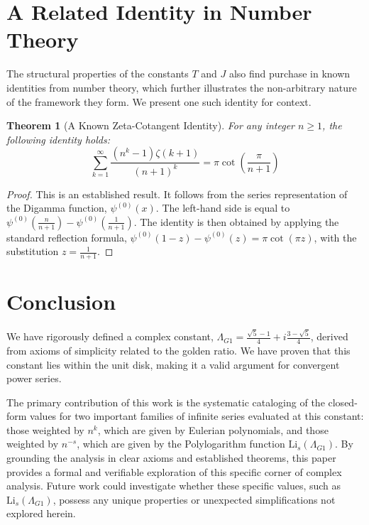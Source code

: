 \documentclass{amsart}
\theoremstyle{plain}
\newtheorem{theorem}{Theorem}[section]
\theoremstyle{definition}
\theoremstyle{remark}
\newcommand{\LambdaG}{\Lambda_{G1}}
\begin{document}
\section{A Related Identity in Number Theory}
The structural properties of the constants $T$ and $J$ also find purchase in known identities from number theory, which further illustrates the non-arbitrary nature of the framework they form. We present one such identity for context.

\begin{theorem}[A Known Zeta-Cotangent Identity]
For any integer $n \ge 1$, the following identity holds:
\[ \sum_{k=1}^{\infty} \frac{(n^k-1)\zeta(k+1)}{(n+1)^k} = \pi \cot\left(\frac{\pi}{n+1}\right) \]
\end{theorem}
\begin{proof}
This is an established result. It follows from the series representation of the Digamma function, $\psi^{(0)}(x)$. The left-hand side is equal to $\psi^{(0)}(\frac{n}{n+1}) - \psi^{(0)}(\frac{1}{n+1})$. The identity is then obtained by applying the standard reflection formula, $\psi^{(0)}(1-z)-\psi^{(0)}(z)=\pi \cot(\pi z)$, with the substitution $z = \frac{1}{n+1}$.
\end{proof}

\section{Conclusion}
We have rigorously defined a complex constant, $\Lambda_{G1} = \frac{\sqrt{5}-1}{4} + i\frac{3-\sqrt{5}}{4}$, derived from axioms of simplicity related to the golden ratio. We have proven that this constant lies within the unit disk, making it a valid argument for convergent power series.

The primary contribution of this work is the systematic cataloging of the closed-form values for two important families of infinite series evaluated at this constant: those weighted by $n^k$, which are given by Eulerian polynomials, and those weighted by $n^{-s}$, which are given by the Polylogarithm function $\mathrm{Li}_s(\LambdaG)$. By grounding the analysis in clear axioms and established theorems, this paper provides a formal and verifiable exploration of this specific corner of complex analysis. Future work could investigate whether these specific values, such as $\mathrm{Li}_s(\LambdaG)$, possess any unique properties or unexpected simplifications not explored herein.
\end{document}
